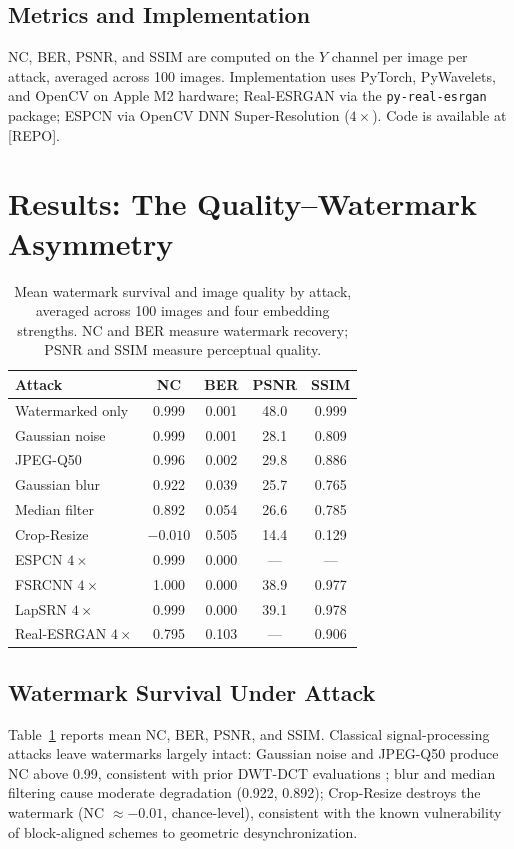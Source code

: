 \documentclass[conference]{IEEEtran}
\begin{document}
\subsection{Metrics and Implementation}
NC, BER, PSNR, and SSIM \cite{ssim2004} are computed on the $Y$ channel
per image per attack, averaged across 100 images. Implementation uses
PyTorch, PyWavelets, and OpenCV on Apple M2 hardware; Real-ESRGAN via
the \texttt{py-real-esrgan} package; ESPCN via OpenCV DNN
Super-Resolution ($4\times$). Code is available at [REPO].

\section{Results: The Quality--Watermark Asymmetry}
\label{sec:results}

\begin{table}[t]
\caption{Mean watermark survival and image quality by attack, averaged
across 100 images and four embedding strengths. NC and BER measure
watermark recovery; PSNR and SSIM measure perceptual quality.}
\label{tab:survival}
\centering
\begin{tabular}{lcccc}
\toprule
Attack & NC & BER & PSNR & SSIM \\
\midrule
Watermarked only       & 0.999  & 0.001 & 48.0 & 0.999 \\
Gaussian noise         & 0.999  & 0.001 & 28.1 & 0.809 \\
JPEG-Q50               & 0.996  & 0.002 & 29.8 & 0.886 \\
Gaussian blur          & 0.922  & 0.039 & 25.7 & 0.765 \\
Median filter          & 0.892  & 0.054 & 26.6 & 0.785 \\
Crop-Resize            & $-0.010$ & 0.505 & 14.4 & 0.129 \\
ESPCN $4\times$        & 0.999  & 0.000 & ---  & ---  \\
FSRCNN $4\times$       & 1.000  & 0.000 & 38.9 & 0.977 \\
LapSRN $4\times$       & 0.999  & 0.000 & 39.1 & 0.978 \\
Real-ESRGAN $4\times$  & 0.795  & 0.103 & ---  & 0.906 \\
\bottomrule
\end{tabular}
\end{table}

\subsection{Watermark Survival Under Attack}
Table~\ref{tab:survival} reports mean NC, BER, PSNR, and SSIM.
Classical signal-processing attacks leave watermarks largely intact:
Gaussian noise and JPEG-Q50 produce NC above 0.99, consistent with prior
DWT-DCT evaluations \cite{alhaj2007}; blur and median filtering cause
moderate degradation (0.922, 0.892); Crop-Resize destroys the watermark
(NC $\approx -0.01$, chance-level), consistent with the known
vulnerability of block-aligned schemes to geometric desynchronization.
\end{document}
